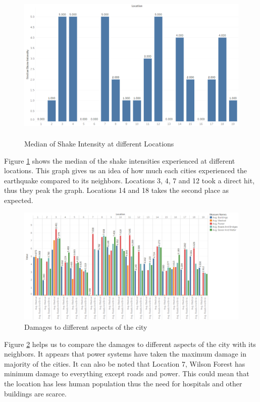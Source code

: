 \documentclass[12pt]{extarticle}
\begin{document}
\begin{figure}[H]
\centering
	\includegraphics[height=75mm, width = 0.8\linewidth]{Images/ShakeInt.png}
	\caption{Median of Shake Intensity at different Locations}
	\label{fig:shakeint}
\end{figure}

Figure \ref{fig:shakeint} shows the median of the shake intensities experienced at different locations. This graph gives us an idea of how much each cities experienced the earthquake compared to its neighbors. Locations 3, 4, 7 and 12 took a direct hit, thus they peak the graph. Locations 14 and 18 takes the second place as expected. 

\begin{figure}[H]
\centering
	\includegraphics[width=\linewidth]{Images/AllSeperate.png}
	\caption{Damages to different aspects of the city}
	\label{fig:allseperate}
\end{figure}

Figure \ref{fig:allseperate} helps us to compare the damages to different aspects of the city with its neighbors.  It appears that power systems have taken the maximum damage in majority of the cities. It can also be noted that Location 7, Wilson Forest has minimum damage to everything except roads and power. This could mean that the location has less human population thus the need for hospitals and other buildings are scarce. \\
\end{document}
